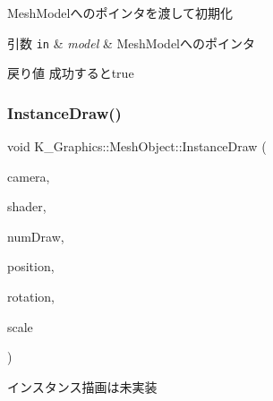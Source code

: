 Mesh\+Modelへのポインタを渡して初期化 


\begin{DoxyParams}[1]{引数}
\mbox{\tt in}  & {\em model} & Mesh\+Modelへのポインタ \\
\hline
\end{DoxyParams}
\begin{DoxyReturn}{戻り値}
成功するとtrue 
\end{DoxyReturn}
\mbox{\label{class_k___graphics_1_1_mesh_object_a049000c7a45b4119fa4523ad1705bb9a}} 
\subsubsection{\texorpdfstring{Instance\+Draw()}{InstanceDraw()}}
{\footnotesize\ttfamily void K\+\_\+\+Graphics\+::\+Mesh\+Object\+::\+Instance\+Draw (\begin{DoxyParamCaption}\item[{\mbox{\hyperlink{class_k___graphics_1_1_camera_class}{Camera\+Class}} $\ast$}]{camera,  }\item[{\mbox{\hyperlink{class_k___graphics_1_1_shader_class}{Shader\+Class}} $\ast$}]{shader,  }\item[{int}]{num\+Draw,  }\item[{const \mbox{\hyperlink{namespace_k___math_a66884d78082c39ada4091c211f3570f8}{K\+\_\+\+Math\+::\+Vector3}} \&}]{position,  }\item[{const \mbox{\hyperlink{namespace_k___math_a66884d78082c39ada4091c211f3570f8}{K\+\_\+\+Math\+::\+Vector3}} \&}]{rotation,  }\item[{const \mbox{\hyperlink{namespace_k___math_a66884d78082c39ada4091c211f3570f8}{K\+\_\+\+Math\+::\+Vector3}} \&}]{scale }\end{DoxyParamCaption})}



インスタンス描画は未実装 

\mbox{\label{class_k___graphics_1_1_mesh_object_a53fca52d8b8b1abb8d91f666f97bb9ea}} 
